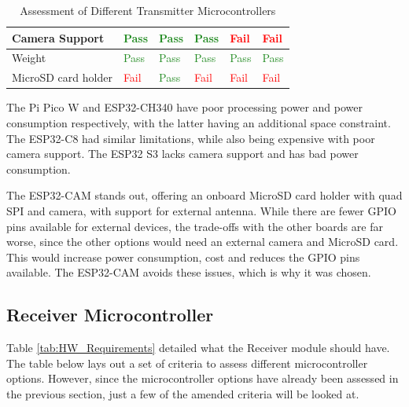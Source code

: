 \documentclass[class=report,11pt,crop=false]{standalone}
\begin{document}
\begin{table}[h]
\begin{tabular}{|p{3.5cm}|l|l|l|l|l|}
\hline
Camera Support & \textcolor{ForestGreen}{Pass} & \textcolor{ForestGreen}{Pass} & \textcolor{ForestGreen}{Pass} & \textcolor{red}{Fail} & \textcolor{red}{Fail} \\
\hline
Weight & \textcolor{ForestGreen}{Pass} & \textcolor{ForestGreen}{Pass} & \textcolor{ForestGreen}{Pass} & \textcolor{ForestGreen}{Pass} & \textcolor{ForestGreen}{Pass} \\
\hline
MicroSD card holder & \textcolor{red}{Fail} & \textcolor{ForestGreen}{Pass} & \textcolor{red}{Fail} & \textcolor{red}{Fail} & \textcolor{red}{Fail} \\
\hline
\end{tabular}
\caption{Assessment of Different Transmitter Microcontrollers}
\label{tab:HW_CT_Result}
\end{table}

The Pi Pico W and ESP32-CH340 have poor processing power and power consumption respectively, with the latter having an additional space constraint. The ESP32-C8 had similar limitations, while also being expensive with poor camera support. The ESP32 S3 lacks camera support and has bad power consumption. 

The ESP32-CAM stands out, offering an onboard MicroSD card holder with quad SPI and camera, with support for external antenna. While there are fewer GPIO pins available for external devices, the trade-offs with the other boards are far worse, since the other options would need an external camera and MicroSD card. This would increase power consumption, cost and reduces the GPIO pins available. The ESP32-CAM avoids these issues, which is why it was chosen. 


\subsection{Receiver Microcontroller}

Table \ref{tab:HW_Requirements} detailed what the Receiver module should have. The table below lays out a set of criteria to assess different microcontroller options. However, since the microcontroller options have already been assessed in the previous section, just a few of the amended criteria will be looked at. 
\end{document}
